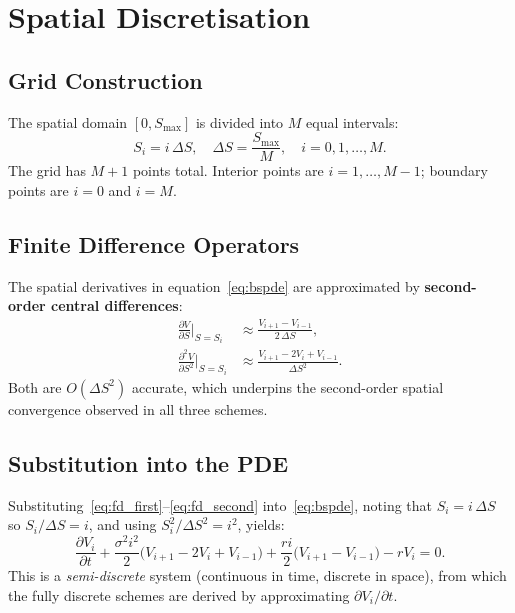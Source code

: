 \documentclass[12pt, a4paper]{article}
\begin{document}
\section{Spatial Discretisation}

\subsection{Grid Construction}

The spatial domain $[0, S_{\max}]$ is divided into $M$ equal intervals:
\[
    S_i = i\,\Delta S, \quad \Delta S = \frac{S_{\max}}{M}, \quad i = 0, 1, \ldots, M.
\]
The grid has $M + 1$ points total. Interior points are $i = 1, \ldots, M-1$;
boundary points are $i = 0$ and $i = M$.

\subsection{Finite Difference Operators}

The spatial derivatives in equation~\eqref{eq:bspde} are approximated by
\textbf{second-order central differences}:
\begin{align}
    \frac{\partial V}{\partial S}\bigg|_{S=S_i}
    &\approx \frac{V_{i+1} - V_{i-1}}{2\,\Delta S},
    \label{eq:fd_first} \\
    \frac{\partial^2 V}{\partial S^2}\bigg|_{S=S_i}
    &\approx \frac{V_{i+1} - 2V_i + V_{i-1}}{\Delta S^2}.
    \label{eq:fd_second}
\end{align}
Both are $O(\Delta S^2)$ accurate, which underpins the second-order spatial
convergence observed in all three schemes.

\subsection{Substitution into the PDE}

Substituting~\eqref{eq:fd_first}--\eqref{eq:fd_second} into~\eqref{eq:bspde},
noting that $S_i = i\,\Delta S$ so $S_i/\Delta S = i$, and using
$S_i^2/\Delta S^2 = i^2$, yields:
\begin{equation}
    \frac{\partial V_i}{\partial t}
    + \frac{\sigma^2 i^2}{2}\bigl(V_{i+1} - 2V_i + V_{i-1}\bigr)
    + \frac{r i}{2}\bigl(V_{i+1} - V_{i-1}\bigr)
    - r V_i = 0.
    \label{eq:semidiscrete}
\end{equation}
This is a \emph{semi-discrete} system (continuous in time, discrete in space),
from which the fully discrete schemes are derived by approximating
$\partial V_i/\partial t$.
\end{document}
